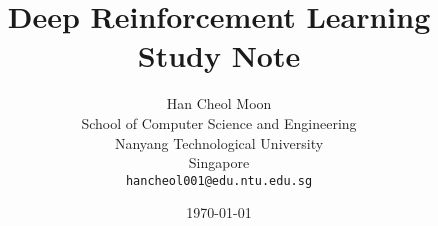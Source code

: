 \documentclass[oneside,a4paper,11pt]{book}
\begin{document}
\author{%
	Han Cheol Moon\\
	School of Computer Science and Engineering\\
	Nanyang Technological University\\
	Singapore\\
	\texttt{hancheol001@edu.ntu.edu.sg}
}
\title{Deep Reinforcement Learning Study Note}
\date{\today}

\frontmatter
\maketitle
\tableofcontents
\newpage

\mainmatter










\backmatter




\appendix

\end{document}
